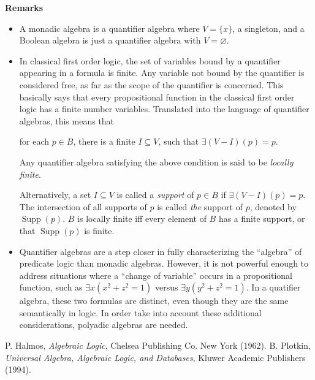 \documentclass[12pt]{article}
\begin{document}
\textbf{Remarks}  
\begin{itemize}
\item
A monadic algebra is a quantifier algebra where $V=\lbrace x\rbrace$, a singleton, and a Boolean algebra is just a quantifier algebra with $V=\varnothing$.
\item
In classical first order logic, the set of variables bound by a quantifier appearing in a formula is finite.  Any variable not bound by the quantifier is considered free, as far as the scope of the quantifier is concerned.  This basically says that every propositional function in the classical first order logic has a finite number variables.  Translated into the language of quantifier algebras, this means that \begin{center} for each $p\in B$, there is a finite $I\subseteq V$, such that $\exists(V-I)(p)=p$. \end{center}  Any quantifier algebra satisfying the above condition is said to be \emph{locally finite}.

Alternatively, a set $I\subseteq V$ is called a \emph{support} of $p\in B$ if $\exists(V-I)(p)=p$.  The intersection of all supports of $p$ is called \emph{the} support of $p$, denoted by $\operatorname{Supp}(p)$.  $B$ is locally finite iff every element of $B$ has a finite support, or that $\operatorname{Supp}(p)$ is finite.
\item
Quantifier algebras are a step closer in fully characterizing the ``algebra'' of predicate logic than monadic algebras.  However, it is not powerful enough to address situations where a ``change of variable'' occurs in a propositional function, such as $\exists x (x^2+z^2=1)$ versus $\exists y (y^2+z^2=1)$.  In a quatifier algebra, these two formulas are distinct, even though they are the same semantically in logic.  In order take into account these additional considerations, polyadic algebras are needed.
\end{itemize}

\begin{thebibliography}{8}
 P. Halmos, \emph{Algebraic Logic}, Chelsea Publishing Co. New York (1962).
 B. Plotkin, \emph{Universal Algebra, Algebraic Logic, and Databases}, Kluwer Academic Publishers (1994).
\end{thebibliography}
\end{document}
